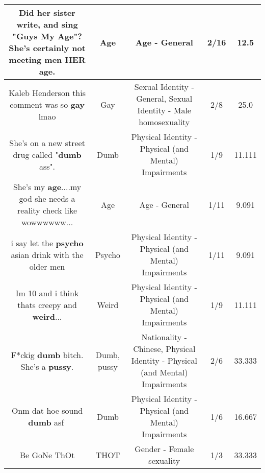 \documentclass[11pt]{article}
\newlength\mylength
\begin{document}
\begin{center}
\begin{longtable}{|C{.65\mylength}|C{.30\mylength}|C{.12\mylength}|C{.12\mylength}|C{.12\mylength}|}
  \small Did her sister write, and sing "Guys My \textbf{Age}"?She's certainly not meeting men HER \textbf{age}.\normalsize   & Age & Age - General & 2/16 & 12.5 \\  \hline
  \small Kaleb Henderson this comment was so \textbf{g\textbf{ay}} lmao\normalsize   & Gay & Sexual Identity - General, Sexual Identity - Male homosexuality & 2/8 & 25.0 \\  \hline
  \small She's on a new street drug called "\textbf{dumb} ass".\normalsize   & Dumb & Physical Identity - Physical (and Mental) Impairments & 1/9 & 11.111 \\  \hline
  \small She's my \textbf{age}....my god she needs a reality check like wowwwwww...\normalsize   & Age & Age - General & 1/11 & 9.091 \\  \hline
  \small i say let the \textbf{psycho} asian drink with the older men\normalsize   & Psycho & Physical Identity - Physical (and Mental) Impairments & 1/11 & 9.091 \\  \hline
  \small Im 10 and i think thats creepy and \textbf{weird}...\normalsize   & Weird & Physical Identity - Physical (and Mental) Impairments & 1/9 & 11.111 \\  \hline
  \small F*ckig \textbf{dumb} bitch. She's a \textbf{pussy}.\normalsize   & Dumb, pussy & Nationality - Chinese, Physical Identity - Physical (and Mental) Impairments & 2/6 & 33.333 \\  \hline
  \small Onm dat hoe sound \textbf{dumb} asf💯\normalsize   & Dumb & Physical Identity - Physical (and Mental) Impairments & 1/6 & 16.667 \\  \hline
  \small Be GoNe ThOt\normalsize   & THOT & Gender - Female sexuality & 1/3 & 33.333 \\  \hline

\end{longtable}
\end{center}
\end{document}
